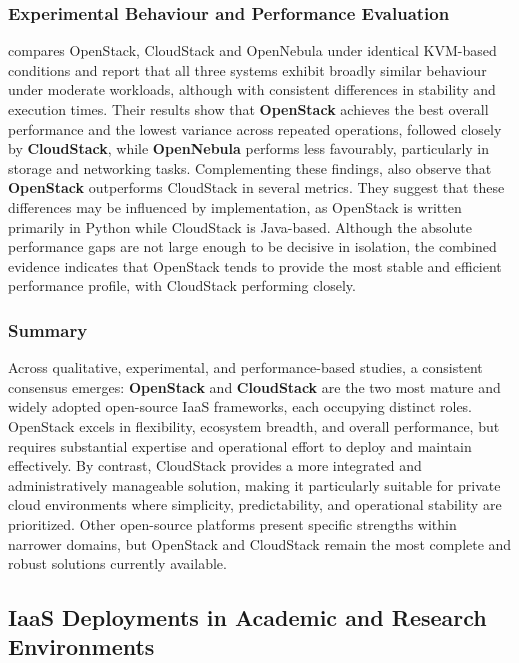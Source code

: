 \documentclass[sigplan]{acmart}
\begin{document}
        \subsubsection{Experimental Behaviour and Performance Evaluation}
            \citeauthor{vogelPrivateIaaSClouds2016}\cite{vogelPrivateIaaSClouds2016} compares OpenStack, CloudStack and OpenNebula under identical KVM-based conditions and report that all three systems exhibit broadly similar behaviour under moderate workloads, although with consistent differences in stability and execution times. Their results show that \textbf{OpenStack} achieves the best overall performance and the lowest variance across repeated operations, followed closely by \textbf{CloudStack}, while \textbf{OpenNebula} performs less favourably, particularly in storage and networking tasks. Complementing these findings, \citeauthor{paradowskiBenchmarkingPerformanceOpenStack2014}\cite{paradowskiBenchmarkingPerformanceOpenStack2014} also observe that \textbf{OpenStack} outperforms CloudStack in several metrics. They suggest that these differences may be influenced by implementation, as OpenStack is written primarily in Python while CloudStack is Java-based. Although the absolute performance gaps are not large enough to be decisive in isolation, the combined evidence indicates that OpenStack tends to provide the most stable and efficient performance profile, with CloudStack performing closely.
        
        \subsubsection{Summary}
            Across qualitative, experimental, and performance-based studies, a consistent consensus emerges: \textbf{OpenStack} and \textbf{CloudStack} are the two most mature and widely adopted open-source IaaS frameworks, each occupying distinct roles. OpenStack excels in flexibility, ecosystem breadth, and overall performance, but requires substantial expertise and operational effort to deploy and maintain effectively. By contrast, CloudStack provides a more integrated and administratively manageable solution, making it particularly suitable for private cloud environments where simplicity, predictability, and operational stability are prioritized. Other open-source platforms present specific strengths within narrower domains, but OpenStack and CloudStack remain the most complete and robust solutions currently available.

    \subsection{IaaS Deployments in Academic and Research Environments} \label{sec:related.academicclouds}
\end{document}
